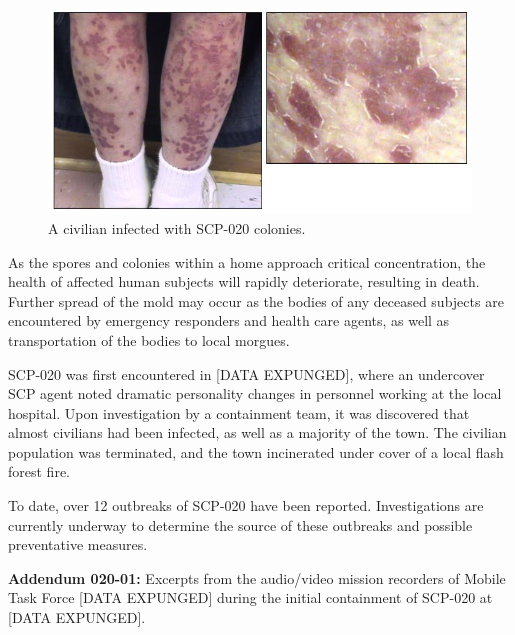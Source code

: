 \begin{figure}[h]
\begin{center}
\includegraphics[scale=0.5]{scp/020b.jpg}
\linebreak A civilian infected with SCP-020 colonies.
\end{center}
\end{figure}

As the spores and colonies within a home approach critical concentration, the health of affected human subjects will rapidly deteriorate, resulting in death. Further spread of the mold may occur as the bodies of any deceased subjects are encountered by emergency responders and health care agents, as well as transportation of the bodies to local morgues.

SCP-020 was first encountered in [DATA EXPUNGED], where an undercover SCP agent noted dramatic personality changes in personnel working at the local hospital. Upon investigation by a containment team, it was discovered that almost  civilians had been infected, as well as a majority of the town. The civilian population was terminated, and the town incinerated under cover of a local flash forest fire.

To date, over 12 outbreaks of SCP-020 have been reported. Investigations are currently underway to determine the source of these outbreaks and possible preventative measures.

\textbf{Addendum 020-01:} Excerpts from the audio/video mission recorders of Mobile Task Force [DATA EXPUNGED] during the initial containment of SCP-020 at [DATA EXPUNGED].

